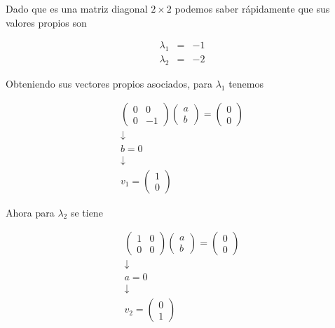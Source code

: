 \documentclass[10pt,letterpaper,titlepage]{article}
\begin{document}
Dado que es una matriz diagonal $2 \times 2$ podemos saber rápidamente que sus valores propios son

\[
	\begin{array}{rcl}
		\lambda_1 & = & -1 \\
		\lambda_2 & = & -2
	\end{array}
\]

Obteniendo sus vectores propios asociados, para $\lambda_1$ tenemos

\[
	\begin{array}{c}
		\left(\begin{matrix}
			0 & 0 \\
			0 & -1
		\end{matrix}\right)
		\left(\begin{matrix}
			a \\
			b
		\end{matrix}\right) = \left(\begin{matrix}
			0 \\
			0
		\end{matrix}\right) \\
		\downarrow \\
		b = 0 \\
		\downarrow \\
		v_1 = \left(\begin{matrix}
			1 \\
			0
		\end{matrix}\right)
	\end{array}
\]

Ahora para $\lambda_2$ se tiene

\[
	\begin{array}{c}
		\left(\begin{matrix}
			1 & 0 \\
			0 & 0
		\end{matrix}\right)\left(\begin{matrix}
			a \\
			b
		\end{matrix}\right) = \left(\begin{matrix}
			0 \\
			0
		\end{matrix}\right) \\
		\downarrow \\
		a = 0 \\
		\downarrow \\
		v_2 = \left(\begin{matrix}
			0 \\
			1
		\end{matrix}\right)
	\end{array}
\]
\end{document}
